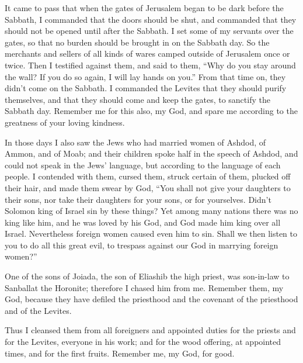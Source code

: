 \myverse{}It came to pass that when the gates of Jerusalem began to be
dark before the Sabbath, I commanded that the doors should be shut, and commanded that they should not
be opened until after the Sabbath. I set some of my servants over the gates, so that no burden should
be brought in on the Sabbath day.
\myverse{}So the merchants and sellers of all kinds of wares camped outside of Jerusalem
once or twice.
\myverse{}Then I testified against them, and said to them, “Why do you stay around
the wall? If you do so again, I will lay hands on you.” From that time on, they didn’t come on the Sabbath.
\myverse{}I commanded the Levites that they should purify themselves, and that they
should come and keep the gates, to sanctify the Sabbath day. Remember me for this also, my God, and spare
me according to the greatness of your loving kindness.

\myverse{}In those days I also saw the Jews who had married women of Ashdod,
of Ammon, and of Moab;
\myverse{}and their children spoke half in the speech of Ashdod, and could not speak
in the Jews’ language, but according to the language of each people.
\myverse{}I contended with them, cursed them, struck certain of them, plucked off their
hair, and made them swear by God, “You shall not give your daughters to their sons, nor take their daughters
for your sons, or for yourselves.
\myverse{}Didn’t Solomon king of Israel sin by these things? Yet among many nations
there was no king like him, and he was loved by his God, and God made him king over all Israel. Nevertheless
foreign women caused even him to sin.
\myverse{}Shall we then listen to you to do all this great evil, to trespass against
our God in marrying foreign women?”

\myverse{}One of the sons of Joiada, the son of Eliashib the high priest,
was son-in-law to Sanballat the Horonite; therefore I chased him from me.
\myverse{}Remember them, my God, because they have defiled the priesthood and the covenant
of the priesthood and of the Levites.

\myverse{}Thus I cleansed them from all foreigners and appointed duties
for the priests and for the Levites, everyone in his work;
\myverse{}and for the wood offering, at appointed times, and for the first fruits.
Remember me, my God, for good.


